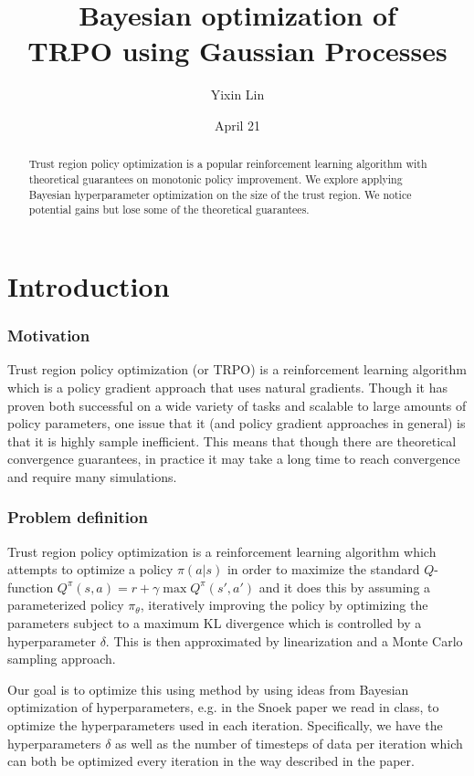 \documentclass[12pt]{article}
\title{Bayesian optimization of\\TRPO using Gaussian Processes}
\date{April 21}
\author{Yixin Lin}
\theoremstyle{plain}
\begin{document}
\maketitle

\begin{abstract}
  Trust region policy optimization is a popular reinforcement learning algorithm with theoretical guarantees on monotonic policy improvement. We explore applying Bayesian hyperparameter optimization on the size of the trust region. We notice potential gains but lose some of the theoretical guarantees.
\end{abstract}

\part{Introduction}

\section{Motivation}

Trust region policy optimization (or TRPO) is a reinforcement learning algorithm which is a policy gradient approach that uses natural gradients. Though it has proven both successful on a wide variety of tasks and scalable to large amounts of policy parameters, one issue that it (and policy gradient approaches in general) is that it is highly sample inefficient. This means that though there are theoretical convergence guarantees, in practice it may take a long time to reach convergence and require many simulations.

\section{Problem definition} 

Trust region policy optimization is a reinforcement learning algorithm which attempts to optimize a policy $ \pi(a|s) $
in order to maximize the standard $Q$-function $ Q^\pi(s,a) = r + \gamma \max Q^\pi(s',a') $
and it does this by assuming a parameterized policy $\pi_\theta$, iteratively improving the policy by optimizing the parameters subject to a maximum KL divergence which is controlled by a hyperparameter $\delta$. This is then approximated by linearization and a Monte Carlo sampling approach.

Our goal is to optimize this using method by using ideas from Bayesian optimization of hyperparameters, e.g. in the Snoek paper we read in class, to optimize the hyperparameters used in each iteration. Specifically, we have the hyperparameters $\delta$ as well as the number of timesteps of data per iteration which can both be optimized every iteration in the way described in the paper.
\end{document}
